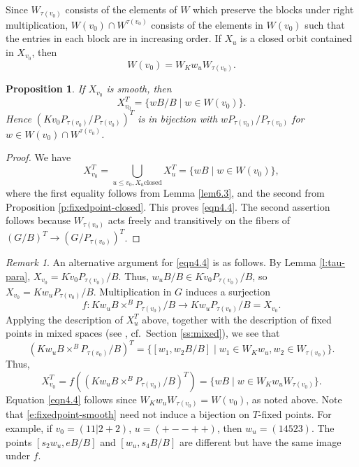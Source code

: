 \documentclass[11pt,letterpaper,reqno]{amsart}
\numberwithin{equation}{section}
\theoremstyle{plain}
\newtheorem{proposition}[theorem]{Proposition}
\theoremstyle{definition}
\theoremstyle{remark}
\newtheorem{remark}[theorem]{Remark}
\begin{document}
Since $W_{\tau(v_0)}$ consists of the elements of $W$ which preserve the blocks under right
multiplication,
$W(v_0) \cap W^{\tau(v_0)}$ consists of the elements in $W(v_0)$ such that the entries in each block
are in increasing order.  If $X_u$ is a closed orbit contained in $X_{v_0}$, then 
\begin{equation} \label{e:wv0}
W(v_0) = W_K w_u W_{\tau(v_0)}.
\end{equation}

\begin{proposition} \label{p:fixedpoint-smooth}
If $X_{v_0}$ is smooth, then 
\begin{equation}\label{eqn4.4}
X_{v_0}^T = \{ w B/B \mid w \in W(v_0) \}. 
\end{equation}
Hence $(K v_0 P_{\tau(v_0)}/P_{\tau(v_0)})^T$ is in bijection with $w P_{\tau(v_0)}/P_{\tau(v_0)}$ for $w \in W(v_0) \cap W^{\tau(v_0)}$.
\end{proposition}

\begin{proof}
We have 
\begin{equation}
X_{v_0}^T = \bigcup_{u \leq v_0, X_u \text{closed}}X_u^{T} =  \{ w B \mid w \in W(v_0) \},
\end{equation}
where the first equality follows from Lemma \ref{lem6.3}, and the second from Proposition \ref{p:fixedpoint-closed}.
This proves \eqref{eqn4.4}.  The second assertion follows because $W_{\tau(v_0)}$
acts freely and transitively on the fibers of $(G/B)^T \to (G/P_{\tau(v_0)})^T$.
\end{proof}

\begin{remark} \label{r:fixedpoint-smooth}
An alternative argument for \eqref{eqn4.4} is as follows.  By Lemma \ref{l:tau-para}, $X_{v_0} = K \dot{v}_0 P_{\tau(v_0)}/B$.  Thus, $w_u B/B \in K \dot{v}_0 P_{\tau(v_0)}/B$,
so $X_{v_0} = K w_u P_{\tau(v_0)}/B$.
Multiplication in $G$ induces a surjection
\begin{equation} \label{e:fixedpoint-smooth}
f: K w_u B \times^B P_{\tau(v_0)}/B \to K w_u P_{\tau(v_0)}/B = X_{v_0}.
\end{equation}
Applying the description of $X_u^T$ above, together with the description of fixed points in mixed spaces (see \cite[Section 3]{GZ}, cf.~Section \ref{ss:mixed}), we see that
$$
(K w_u B \times^B P_{\tau(v_0)}/B)^T = \{ [w_1, w_2 B/B] \mid w_1 \in W_K w_u, w_2 \in W_{\tau(v_0)}\}.
$$
Thus,
$$
X_{v_0}^T = f((K w_u B \times^B P_{\tau(v_0)}/B)^T) = \{ w B \mid w \in W_K w_u W_{\tau(v_0)} \}.
$$
Equation \eqref{eqn4.4} follows since $W_K w_u W_{\tau(v_0)} = W(v_0)$, as noted above.
Note that \eqref{e:fixedpoint-smooth} need not induce a bijection on $T$-fixed points.  For example, if $v_0 = (1 1 | 2 + 2)$, $u = (+ - - + +)$, then
$w_u = (1 4 5 2 3)$.  The points $[s_2 w_u, eB/B]$ and $[w_u, s_4 B/B]$ are different but have the same image under $f$.
\end{remark}
\end{document}
